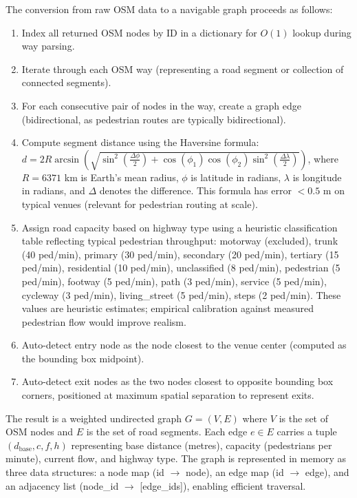\documentclass[conference]{IEEEtran}
\begin{document}
The conversion from raw OSM data to a navigable graph proceeds as follows:
\begin{enumerate}
\item Index all returned OSM nodes by ID in a dictionary for $O(1)$ lookup during way parsing.
\item Iterate through each OSM way (representing a road segment or collection of connected segments).
\item For each consecutive pair of nodes in the way, create a graph edge (bidirectional, as pedestrian routes are typically bidirectional).
\item Compute segment distance using the Haversine formula: $d = 2R \arcsin\left(\sqrt{\sin^2\left(\frac{\Delta\phi}{2}\right) + \cos(\phi_1)\cos(\phi_2)\sin^2\left(\frac{\Delta\lambda}{2}\right)}\right)$, where $R = 6371$ km is Earth's mean radius, $\phi$ is latitude in radians, $\lambda$ is longitude in radians, and $\Delta$ denotes the difference. This formula has error $< 0.5$ m on typical venues (relevant for pedestrian routing at scale).
\item Assign road capacity based on highway type using a heuristic classification table reflecting typical pedestrian throughput: motorway (excluded), trunk (40 ped/min), primary (30 ped/min), secondary (20 ped/min), tertiary (15 ped/min), residential (10 ped/min), unclassified (8 ped/min), pedestrian (5 ped/min), footway (5 ped/min), path (3 ped/min), service (5 ped/min), cycleway (3 ped/min), living\_street (5 ped/min), steps (2 ped/min). These values are heuristic estimates; empirical calibration against measured pedestrian flow would improve realism.
\item Auto-detect entry node as the node closest to the venue center (computed as the bounding box midpoint).
\item Auto-detect exit nodes as the two nodes closest to opposite bounding box corners, positioned at maximum spatial separation to represent exits.
\end{enumerate}

The result is a weighted undirected graph $G = (V, E)$ where $V$ is the set of OSM nodes and $E$ is the set of road segments. Each edge $e \in E$ carries a tuple $(d_{\text{base}}, c, f, h)$ representing base distance (metres), capacity (pedestrians per minute), current flow, and highway type. The graph is represented in memory as three data structures: a node map (id $\to$ node), an edge map (id $\to$ edge), and an adjacency list (node\_id $\to$ [edge\_ids]), enabling efficient traversal.
\end{document}

